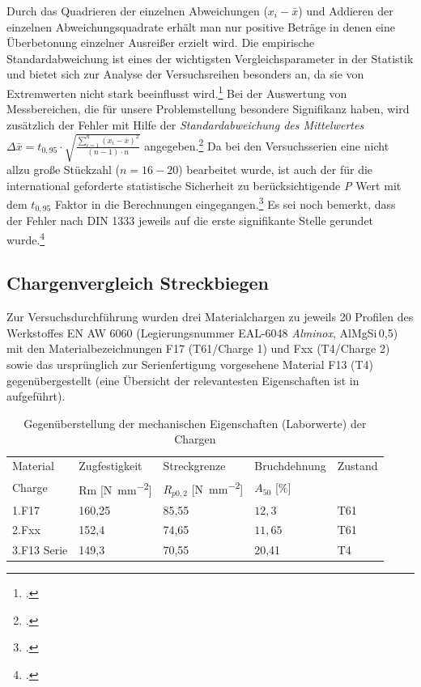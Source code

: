 \documentclass[12pt,a4paper,parskip]{scrartcl}
\begin{document}
Durch das Quadrieren der einzelnen Abweichungen ($ x_i-\bar{x}$) und Addieren der einzelnen Abweichungsquadrate erhält man nur positive Beträge in denen eine Überbetonung einzelner Ausreißer erzielt wird.
Die empirische Standardabweichung ist   eines der wichtigsten Vergleichsparameter in der Statistik und bietet sich zur Analyse der Versuchsreihen besonders an, da sie von Extremwerten nicht stark beeinflusst wird.\footcite[Vgl.][54]{gst} Bei der Auswertung von Messbereichen, die für unsere Problemstellung besondere Signifikanz haben, wird zusätzlich der Fehler mit Hilfe der  \emph{Standardabweichung des Mittelwertes}  $ \Delta\bar{x}= t_{0,95} \cdot \sqrt{\frac{\sum \limits_{i=1}^n (x_i - \bar{x})^2}{(n-1)\cdot n}}$ angegeben.\footcite[Vgl.][16]{ph} Da bei den Versuchsserien eine nicht allzu große Stückzahl ($ n=16-20 $) bearbeitet wurde,  ist auch der für die international geforderte statistische Sicherheit zu berücksichtigende \emph{P} Wert mit dem $ t_{0,95} $ Faktor in die Berechnungen eingegangen.\footcite[Vgl.][609]{tp}  Es sei noch bemerkt, dass der Fehler nach DIN 1333 jeweils auf die erste signifikante Stelle gerundet wurde.\footcite[Vgl.][612]{tp}
 	 	
 	

 	
 	 	


\subsection{Chargenvergleich Streckbiegen}
Zur Versuchsdurchführung wurden drei Materialchargen zu jeweils 20 Profilen des Werkstoffes EN AW 6060 (Legierungsnummer EAL-6048 \emph{Alminox}, AlMgSi\,0,5) mit den Materialbezeichnungen F17 (T61/Charge 1) und Fxx (T4/Charge 2) sowie das ursprünglich zur Serienfertigung vorgesehene Material F13 (T4)  gegenübergestellt (eine Übersicht der relevantesten Eigenschaften ist in  aufgeführt).
\begin{table}[htbp]
\caption{Gegenüberstellung der mechanischen Eigenschaften (Laborwerte) der Chargen}
\label{tab:chargeneigenschaften}
\centering
\begin{tabular}{lllll}
\toprule
Material & Zugfestigkeit & Streckgrenze & Bruchdehnung & Zustand \\
Charge &  Rm [\si{\newton\per\milli\meter\squared}] &  $R_{p0,2}$ [\si{\newton\per\milli\meter\squared}] &  $A_{50}$ [\%] & \\
\midrule
1.F17 & 160,25 & 85,55 & $ 12,3 $ & T61 \\
2.Fxx & 152,4 & 74,65 &  $ 11,65 $ & T61 \\
3.F13 Serie & 149,3 & 70,55 & 20,41  & T4 \\
\bottomrule




\end{tabular}
\end{table}
\end{document}
